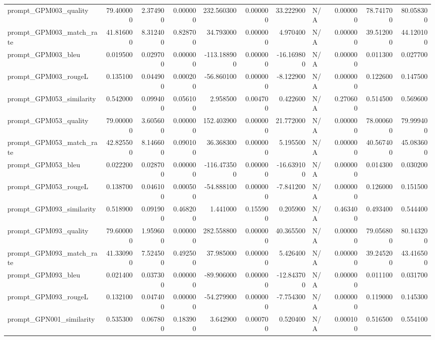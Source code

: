 \begin{tabular}{lrrrrrrlrrr}
prompt_GPM003_quality & 79.400000 & 2.374900 & 0.000000 & 232.560300 & 0.000000 & 33.222900 & N/A & 0.000000 & 78.741700 & 80.058300 \\
prompt_GPM003_match_rate & 41.816000 & 8.312400 & 0.828700 & 34.793000 & 0.000000 & 4.970400 & N/A & 0.000000 & 39.512000 & 44.120100 \\
prompt_GPM003_bleu & 0.019500 & 0.029700 & 0.000000 & -113.188900 & 0.000000 & -16.169800 & N/A & 0.000000 & 0.011300 & 0.027700 \\
prompt_GPM003_rougeL & 0.135100 & 0.044900 & 0.000200 & -56.860100 & 0.000000 & -8.122900 & N/A & 0.000000 & 0.122600 & 0.147500 \\
prompt_GPM053_similarity & 0.542000 & 0.099400 & 0.056100 & 2.958500 & 0.004700 & 0.422600 & N/A & 0.270600 & 0.514500 & 0.569600 \\
prompt_GPM053_quality & 79.000000 & 3.605600 & 0.000000 & 152.403900 & 0.000000 & 21.772000 & N/A & 0.000000 & 78.000600 & 79.999400 \\
prompt_GPM053_match_rate & 42.825500 & 8.146600 & 0.090100 & 36.368300 & 0.000000 & 5.195500 & N/A & 0.000000 & 40.567400 & 45.083600 \\
prompt_GPM053_bleu & 0.022200 & 0.028700 & 0.000000 & -116.473500 & 0.000000 & -16.639100 & N/A & 0.000000 & 0.014300 & 0.030200 \\
prompt_GPM053_rougeL & 0.138700 & 0.046100 & 0.000500 & -54.888100 & 0.000000 & -7.841200 & N/A & 0.000000 & 0.126000 & 0.151500 \\
prompt_GPM093_similarity & 0.518900 & 0.091900 & 0.468200 & 1.441000 & 0.155900 & 0.205900 & N/A & 0.463400 & 0.493400 & 0.544400 \\
prompt_GPM093_quality & 79.600000 & 1.959600 & 0.000000 & 282.558800 & 0.000000 & 40.365500 & N/A & 0.000000 & 79.056800 & 80.143200 \\
prompt_GPM093_match_rate & 41.330900 & 7.524500 & 0.492500 & 37.985000 & 0.000000 & 5.426400 & N/A & 0.000000 & 39.245200 & 43.416500 \\
prompt_GPM093_bleu & 0.021400 & 0.037300 & 0.000000 & -89.906000 & 0.000000 & -12.843700 & N/A & 0.000000 & 0.011100 & 0.031700 \\
prompt_GPM093_rougeL & 0.132100 & 0.047400 & 0.000000 & -54.279900 & 0.000000 & -7.754300 & N/A & 0.000000 & 0.119000 & 0.145300 \\
prompt_GPN001_similarity & 0.535300 & 0.067800 & 0.183900 & 3.642900 & 0.000700 & 0.520400 & N/A & 0.000100 & 0.516500 & 0.554100 \\

\end{tabular}
